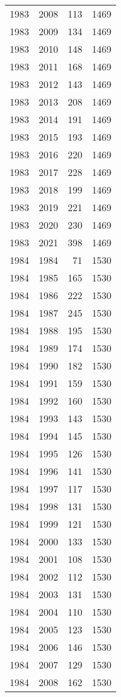 \documentclass[
  11pt,
  letterpaper,
  DIV=11,
  numbers=noendperiod,
  twoside]{scrartcl}
\begin{document}
\begin{longtable}[]{@{}rrrr@{}}
1983 & 2008 & 113 & 1469 \\
1983 & 2009 & 134 & 1469 \\
1983 & 2010 & 148 & 1469 \\
1983 & 2011 & 168 & 1469 \\
1983 & 2012 & 143 & 1469 \\
1983 & 2013 & 208 & 1469 \\
1983 & 2014 & 191 & 1469 \\
1983 & 2015 & 193 & 1469 \\
1983 & 2016 & 220 & 1469 \\
1983 & 2017 & 228 & 1469 \\
1983 & 2018 & 199 & 1469 \\
1983 & 2019 & 221 & 1469 \\
1983 & 2020 & 230 & 1469 \\
1983 & 2021 & 398 & 1469 \\
1984 & 1984 & 71 & 1530 \\
1984 & 1985 & 165 & 1530 \\
1984 & 1986 & 222 & 1530 \\
1984 & 1987 & 245 & 1530 \\
1984 & 1988 & 195 & 1530 \\
1984 & 1989 & 174 & 1530 \\
1984 & 1990 & 182 & 1530 \\
1984 & 1991 & 159 & 1530 \\
1984 & 1992 & 160 & 1530 \\
1984 & 1993 & 143 & 1530 \\
1984 & 1994 & 145 & 1530 \\
1984 & 1995 & 126 & 1530 \\
1984 & 1996 & 141 & 1530 \\
1984 & 1997 & 117 & 1530 \\
1984 & 1998 & 131 & 1530 \\
1984 & 1999 & 121 & 1530 \\
1984 & 2000 & 133 & 1530 \\
1984 & 2001 & 108 & 1530 \\
1984 & 2002 & 112 & 1530 \\
1984 & 2003 & 131 & 1530 \\
1984 & 2004 & 110 & 1530 \\
1984 & 2005 & 123 & 1530 \\
1984 & 2006 & 146 & 1530 \\
1984 & 2007 & 129 & 1530 \\
1984 & 2008 & 162 & 1530 \\

\end{longtable}
\end{document}
